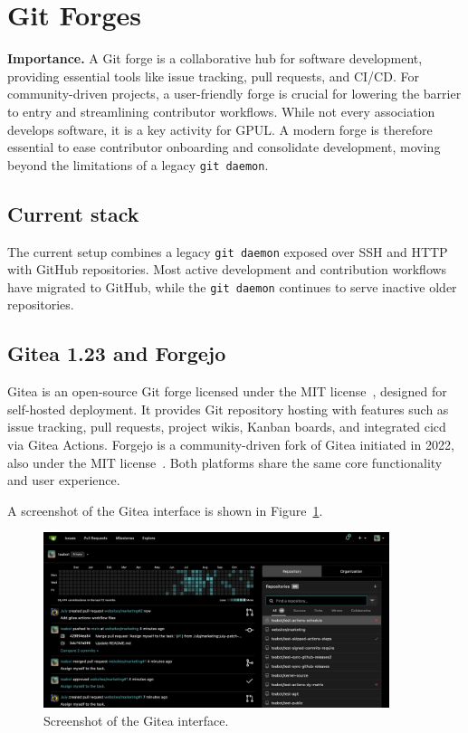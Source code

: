 \section{Git Forges}

\textbf{Importance.} A Git forge is a collaborative hub for software development, providing essential tools like issue tracking, pull requests, and CI/CD. For community-driven projects, a user-friendly forge is crucial for lowering the barrier to entry and streamlining contributor workflows. While not every association develops software, it is a key activity for GPUL. A modern forge is therefore essential to ease contributor onboarding and consolidate development, moving beyond the limitations of a legacy \texttt{git daemon}.

\subsection*{Current stack}
The current setup combines a legacy \verb|git daemon| exposed over SSH and HTTP with GitHub repositories. Most active development and contribution workflows have migrated to GitHub, while the \texttt{git daemon} continues to serve inactive older repositories.

\subsection*{Gitea 1.23 and Forgejo}

Gitea is an open-source Git forge licensed under the MIT license~\cite{gitea-docs}, designed for self-hosted deployment. It provides Git repository hosting with features such as issue tracking, pull requests, project wikis, Kanban boards, and integrated \gls{cicd} via Gitea Actions. Forgejo is a community-driven fork of Gitea initiated in 2022, also under the MIT license~\cite{forgejo-docs}. Both platforms share the same core functionality and user experience.

A screenshot of the Gitea interface is shown in Figure~\ref{fig:gitea-ui}.

\begin{figure}[h!]
  \centering
  \includegraphics[width=0.9\textwidth]{imaxes/gitea-ui.png}
  \caption{Screenshot of the Gitea interface.}
  \label{fig:gitea-ui}
\end{figure}

